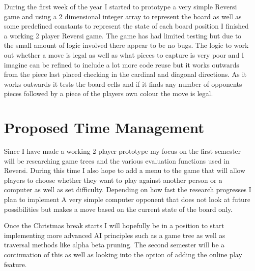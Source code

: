 \documentclass[proposal]{cmpreport}
\begin{document}
During the first week of the year I started to prototype a very simple Reversi game and using a 2 dimensional integer array to represent the board as well as some predefined constants to represent the state of each board position I finished a working 2 player Reversi game. The game has had limited testing but due to the small amount of logic involved there appear to be no bugs. The logic to work out whether a move is legal as well as what pieces to capture is very poor and I imagine can be refined to include a lot more code reuse but it works outwards from the piece last placed checking in the cardinal and diagonal directions. As it works outwards it tests the board cells and if it finds any number of opponents pieces followed by a piece of the players own colour the move is legal.
\section{Proposed Time Management}
Since I have made a working 2 player prototype my focus on the first semester will be researching game trees and the various evaluation functions used in Reversi. During this time I also hope to add a menu to the game that will allow players to choose whether they want to play against another person or a computer as well as set difficulty. Depending on how fast the research progresses I plan to implement A very simple computer opponent that does not look at future possibilities but makes a move based on the current state of the board only.

Once the Christmas break starts I will hopefully be in a position to start implementing more advanced AI principles such as a game tree as well as traversal methods like alpha beta pruning. The second semester will be a continuation of this as well as looking into the option of adding the online play feature.
\end{document}
